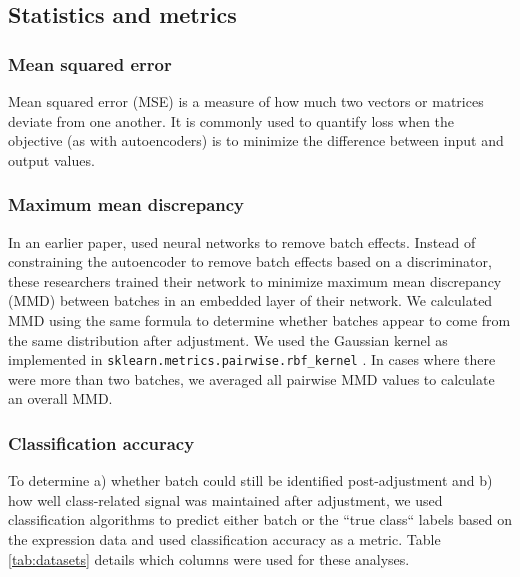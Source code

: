 \documentclass[11pt]{article}
\begin{document}
\subsection{Statistics and metrics}

\subsubsection{Mean squared error}

Mean squared error (MSE) is a measure of how much two vectors or matrices deviate from one another.
It is commonly used to quantify loss when the objective (as with autoencoders) is to minimize the difference between input and output values.

\subsubsection{Maximum mean discrepancy} \label{section:mmd}

In an earlier paper, \citet{shaham_removal_2017} used neural networks to remove batch effects.
Instead of constraining the autoencoder to remove batch effects based on a discriminator, these researchers trained their network to minimize maximum mean discrepancy (MMD) between batches in an embedded layer of their network.
We calculated MMD using the same formula to determine whether batches appear to come from the same distribution after adjustment.
We used the Gaussian kernel as implemented in \texttt{sklearn.metrics.pairwise.rbf\_kernel} \cite{pedregosa_scikit-learn_2011}.
In cases where there were more than two batches, we averaged all pairwise MMD values to calculate an overall MMD.

\subsubsection{Classification accuracy}

To determine
a) whether batch could still be identified post-adjustment and
b) how well class-related signal was maintained after adjustment,
we used classification algorithms to predict either batch or the ``true class`` labels based on the expression data and used classification accuracy as a metric.
Table \ref{tab:datasets} details which columns were used for these analyses.
\end{document}

